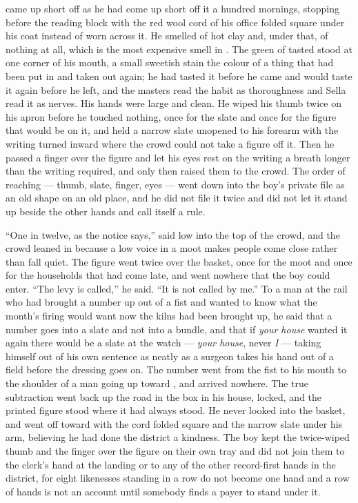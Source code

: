  came up short off  as he had come up short off it a hundred mornings, stopping before the reading block with the red wool cord of his office folded square under his coat instead of worn across it. He smelled of hot clay and, under that, of nothing at all, which is the most expensive smell in . The green of tasted  stood at one corner of his mouth, a small sweetish stain the colour of a thing that had been put in and taken out again; he had tasted it before he came and would taste it again before he left, and the masters read the habit as thoroughness and Sella read it as nerves. His hands were large and clean. He wiped his thumb twice on his apron before he touched nothing, once for the slate and once for the figure that would be on it, and held a narrow slate unopened to his forearm with the writing turned inward where the crowd could not take a figure off it. Then he passed a finger over the figure and let his eyes rest on the writing a breath longer than the writing required, and only then raised them to the crowd. The order of reaching --- thumb, slate, finger, eyes --- went down into the boy's private file as an old shape on an old place, and he did not file it twice and did not let it stand up beside the other hands and call itself a rule.

“One in twelve, as the notice says,”  said low into the top of the crowd, and the crowd leaned in because a low voice in a moot makes people come close rather than fall quiet. The figure went twice over the basket, once for the moot and once for the households that had come late, and went nowhere that the boy could enter. “The levy is called,” he said. “It is not called by me.” To a man at the rail who had brought a number up out of a fist and wanted to know what the month's firing would want now the kilns had been brought up, he said that a number goes into a slate and not into a bundle, and that if \emph{your house} wanted it again there would be a slate at the watch --- \emph{your house}, never \emph{I} --- taking himself out of his own sentence as neatly as a surgeon takes his hand out of a field before the dressing goes on. The number went from the fist to his mouth to the shoulder of a man going up toward , and arrived nowhere. The true subtraction went back up the road in the box in his house, locked, and the printed figure stood where it had always stood. He never looked into the basket, and went off toward  with the cord folded square and the narrow slate under his arm, believing he had done the district a kindness. The boy kept the twice-wiped thumb and the finger over the figure on their own tray and did not join them to the clerk's hand at the landing or to any of the other record-first hands in the district, for eight likenesses standing in a row do not become one hand and a row of hands is not an account until somebody finds a payer to stand under it.

